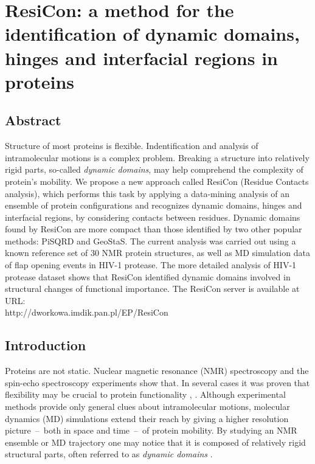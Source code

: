 



\newcommand{\angstrom}{\mbox{\normalfont\AA}}
\newcommand{\myHeight}{0.13}
\renewcommand{\arraystretch}{1.9} %



\chapter[Dynamic domains identification]{ResiCon: a method for the identification of dynamic domains, hinges and interfacial regions in proteins}

\section{Abstract}

Structure of most proteins is flexible.
Indentification and analysis of intramolecular motions is a complex problem.
Breaking a structure into relatively rigid parts, so-called \emph{dynamic domains}, may help comprehend the complexity of protein's mobility. 
We propose a new approach called ResiCon (Residue Contacts analysis), which performs this task by applying a data-mining analysis of an ensemble of protein configurations and recognizes dynamic domains, hinges and interfacial regions, by considering contacts between residues. 
Dynamic domains found by ResiCon are more compact than those identified by two other popular methods: PiSQRD and GeoStaS.
The current analysis was carried out using a known reference set of 30 NMR protein structures, as well as MD simulation data of flap opening events in HIV-1 protease.
The more detailed analysis of HIV-1 protease dataset shows that ResiCon identified dynamic domains involved in structural changes of functional importance.
The ResiCon server is available at URL:\\ http://dworkowa.imdik.pan.pl/EP/ResiCon

\section{Introduction}
Proteins are not static.
Nuclear magnetic resonance (NMR) spectroscopy \cite{martin1988two} and the spin-echo spectroscopy \cite{bu2011proteins} experiments show that.
In several cases it was proven that flexibility may be crucial to protein functionality \cite{farago2010activation}, \cite{hamelberg2005fast}.
Although experimental methods provide only general clues about intramolecular motions, molecular dynamics (MD) simulations extend their reach by giving a higher resolution picture~--~both in space and time~--~of protein mobility.
By studying an NMR ensemble or MD trajectory one may notice that it is composed of relatively rigid structural parts, often referred to as \emph{dynamic domains} \cite{hayward1997model}.

